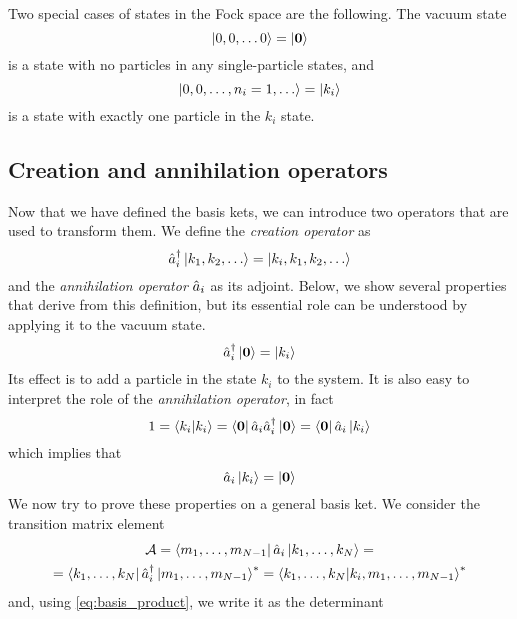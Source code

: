 Two special cases of states in the Fock space are the following. The vacuum state
\begin{equation}
    \ket{0,0,\dots0} = \ket{\mathbf{\boldsymbol{0}}}
\end{equation}
is a state with no particles in any single-particle states, and
\begin{equation}
    \ket{0,0,\dots, n_i = 1, \dots} = \ket{k_i}
\end{equation}
is a state with exactly one particle in the $k_i$ state.

\subsection{Creation and annihilation operators}
Now that we have defined the basis kets, we can introduce two operators that are used to transform them. We define the \emph{creation operator} as
\begin{equation} \label{eq:creation_definition}
    \hat{a}_i^\dagger \ket{k_1, k_2, \dots} = \ket{k_i,k_1, k_2, \dots}
\end{equation} and the \emph{annihilation operator} $\hat{a}_i$ as its adjoint.
Below, we show several properties that derive from this definition, but its essential role can be understood by applying it to the vacuum state.
\begin{equation}
    \hat{a}_i^\dagger \ket{\mathbf{\boldsymbol{0}}} = \ket{k_i}
\end{equation}
Its effect is to add a particle in the state $k_i$ to the system. It is also easy to interpret the role of the \emph{annihilation operator}, in fact
\begin{equation}
    1 = \braket{k_i}{k_i} = \bra{\mathbf{\boldsymbol{0}}}\hat{a}_i\hat{a}_i^\dagger\ket{\mathbf{\boldsymbol{0}}} = \bra{\mathbf{\boldsymbol{0}}}\hat{a}_i\ket{k_i}
\end{equation}
which implies that
\begin{equation}
    \hat{a}_i\ket{k_i} = \ket{\mathbf{\boldsymbol{0}}}
\end{equation}
We now try to prove these properties on a general basis ket. We consider the transition matrix element
\begin{multline} \label{eq:annihilation_matrix}
    \mathcal{A} =  \bra{m_1, \dots, m_{N-1}} \hat{a}_i \ket{k_1, \dots, k_N} =
    \\ =  \bra{k_1, \dots, k_N} \hat{a}_i^\dagger \ket{m_1, \dots, m_{N-1}}^*
    = \bra{k_1, \dots, k_N} \ket{k_i, m_1, \dots, m_{N-1}}^*
\end{multline}
and, using \cref{eq:basis_product}, we write it as the determinant
